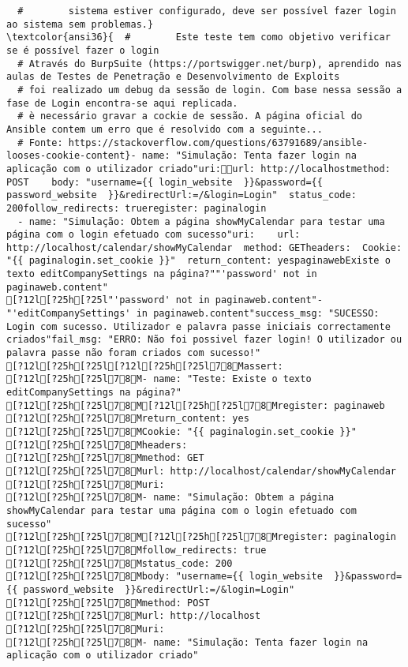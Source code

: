 \documentclass{scrartcl}
\begin{document}
\begin{Verbatim}
  #        sistema estiver configurado, deve ser possível fazer login ao sistema sem problemas.}
\textcolor{ansi36}{  #        Este teste tem como objetivo verificar se é possível fazer o login
  # Através do BurpSuite (https://portswigger.net/burp), aprendido nas aulas de Testes de Penetração e Desenvolvimento de Exploits
  # foi realizado um debug da sessão de login. Com base nessa sessão a fase de Login encontra-se aqui replicada.
  # è necessário gravar a cockie de sessão. A página oficial do Ansible contem um erro que é resolvido com a seguinte...
  # Fonte: https://stackoverflow.com/questions/63791689/ansible-looses-cookie-content}- name: "Simulação: Tenta fazer login na aplicação com o utilizador criado"uri:url: http://localhostmethod: POST    body: "username={{ login_website  }}&password={{ password_website  }}&redirectUrl:=/&login=Login"  status_code: 200follow_redirects: trueregister: paginalogin
  - name: "Simulação: Obtem a página showMyCalendar para testar uma página com o login efetuado com sucesso"uri:    url: http://localhost/calendar/showMyCalendar  method: GETheaders:  Cookie: "{{ paginalogin.set_cookie }}"  return_content: yespaginawebExiste o texto editCompanySettings na página?""'password' not in paginaweb.content"
[?12l[?25h[?25l"'password' not in paginaweb.content"- "'editCompanySettings' in paginaweb.content"success_msg: "SUCESSO: Login com sucesso. Utilizador e palavra passe iniciais correctamente criados"fail_msg: "ERRO: Não foi possivel fazer login! O utilizador ou palavra passe não foram criados com sucesso!"
[?12l[?25h[?25l[?12l[?25h[?25l78Massert:
[?12l[?25h[?25l78M- name: "Teste: Existe o texto editCompanySettings na página?"
[?12l[?25h[?25l78M[?12l[?25h[?25l78Mregister: paginaweb
[?12l[?25h[?25l78Mreturn_content: yes
[?12l[?25h[?25l78MCookie: "{{ paginalogin.set_cookie }}"
[?12l[?25h[?25l78Mheaders:
[?12l[?25h[?25l78Mmethod: GET
[?12l[?25h[?25l78Murl: http://localhost/calendar/showMyCalendar
[?12l[?25h[?25l78Muri:
[?12l[?25h[?25l78M- name: "Simulação: Obtem a página showMyCalendar para testar uma página com o login efetuado com sucesso"
[?12l[?25h[?25l78M[?12l[?25h[?25l78Mregister: paginalogin
[?12l[?25h[?25l78Mfollow_redirects: true
[?12l[?25h[?25l78Mstatus_code: 200
[?12l[?25h[?25l78Mbody: "username={{ login_website  }}&password={{ password_website  }}&redirectUrl:=/&login=Login"
[?12l[?25h[?25l78Mmethod: POST
[?12l[?25h[?25l78Murl: http://localhost
[?12l[?25h[?25l78Muri:
[?12l[?25h[?25l78M- name: "Simulação: Tenta fazer login na aplicação com o utilizador criado"

\end{Verbatim}
\end{document}
